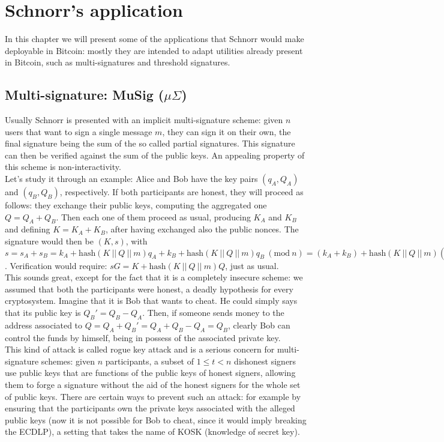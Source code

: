 \chapter{Schnorr's application}
\label{chpr:application}
In this chapter we will present some of the applications that Schnorr would make deployable in Bitcoin: mostly they are intended to adapt utilities already present in Bitcoin, such as multi-signatures and threshold signatures. 

\bigskip

\section{Multi-signature: MuSig ($\mu \Sigma$)}
Usually Schnorr is presented with an implicit multi-signature scheme: given $n$ users that want to sign a single message $m$, they can sign it on their own, the final signature being the sum of the so called partial signatures. This signature can then be verified against the sum of the public keys. An appealing property of this scheme is non-interactivity.
\\
Let's study it through an example: Alice and Bob have the key pairs $(q_A, Q_A)$ and $(q_B, Q_B)$, respectively. If both participants are honest, they will proceed as follows: they exchange their public keys, computing the aggregated one $Q = Q_A + Q_B$. Then each one of them proceed as usual, producing $K_A$ and $K_B$ and defining $K = K_A + K_B$, after having exchanged also the public nonces. The signature would then be $(K, s)$, with $s = s_A + s_B = k_A + \text{hash}(K \ || \ Q \ || \ m)q_A + k_B + \text{hash}(K \ || \ Q \ || \ m)q_B \ (\text{mod} \ n)= (k_A + k_B) + \text{hash}(K \ || \ Q \ || \ m)(q_A + q_B) \ (\text{mod} \ n)$. Verification would require: $sG = K + \text{hash}(K \ || \ Q \ || \ m)Q$, just as usual.
\\
This sounds great, except for the fact that it is a completely insecure scheme: we assumed that both the participants were honest, a deadly hypothesis for every cryptosystem. Imagine that it is Bob that wants to cheat. He could simply says that its public key is $Q_B' = Q_B - Q_A$. Then, if someone sends money to the address associated to $Q = Q_A + Q_B' = Q_A + Q_B - Q_A = Q_B$, clearly Bob can control the funds by himself, being in possess of the associated private key.
\\
This kind of attack is called rogue key attack and is a serious concern for multi-signature schemes: given $n$ participants, a subset of $1 \leq t < n$ dishonest signers use public keys that are functions of the public keys of honest signers, allowing them to forge a signature without the aid of the honest signers for the whole set of public keys. There are certain ways to prevent such an attack: for example by ensuring that the participants own the private keys associated with the alleged public keys (now it is not possible for Bob to cheat, since it would imply breaking the ECDLP), a setting that takes the name of KOSK (knowledge of secret key). 

